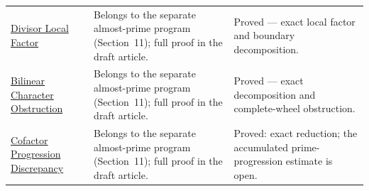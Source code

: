 {\begin{longtable}{>{\raggedright\arraybackslash}p{}>{\raggedright\arraybackslash}p{}>{\raggedright\arraybackslash}p{}}
\href{https://github.com/thiagomata/prime-numbers/blob/master/properties/sieve-sequence/relaxed-almost-prime-divisor-local-factor.md}{Divisor Local Factor} & Belongs to the separate almost-prime program (Section~11); full proof in the draft article. & Proved --- exact local factor and boundary decomposition.\\
\href{https://github.com/thiagomata/prime-numbers/blob/master/properties/sieve-sequence/relaxed-almost-prime-bilinear-character-obstruction.md}{Bilinear Character Obstruction} & Belongs to the separate almost-prime program (Section~11); full proof in the draft article. & Proved --- exact decomposition and complete-wheel obstruction.\\
\href{https://github.com/thiagomata/prime-numbers/blob/master/properties/sieve-sequence/relaxed-cofactor-divisor-sum-is-prime-progression-discrepancy.md}{Cofactor Progression Discrepancy} & Belongs to the separate almost-prime program (Section~11); full proof in the draft article. & Proved: exact reduction; the accumulated prime-progression estimate is open.\\
\hline
\end{longtable}
\par}
